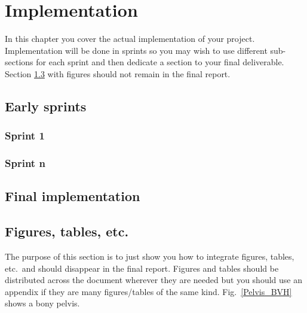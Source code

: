 \documentclass[a4paper, oneside, 11pt]{report}
\begin{document}
\chapter{Implementation}\label{Impl}

In this chapter you cover the actual implementation of your project. Implementation will be done in sprints so you may wish to use different sub-sections for each sprint and then dedicate a section to your final deliverable. Section \ref{Figures} with figures  should not remain in the final report.

\section{Early sprints}
\subsection{Sprint 1}

\subsection{Sprint n}

\section{Final implementation}

\section{Figures, tables, etc.}
\label{Figures}

The purpose of this section is to just show you how to integrate figures, tables, etc.\ and should disappear in the final report. Figures and tables should be distributed across the document wherever they are needed but you should use an appendix if they are many figures/tables of the same kind. Fig.\ \ref{Pelvis_BVH} shows a bony pelvis.
\end{document}
